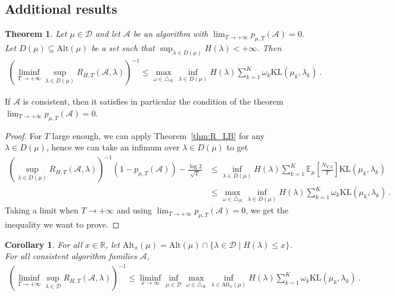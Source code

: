 \documentclass{article}
\newcommand{\KL}{\mathrm{KL}}
\newcommand{\alt}{\mathrm{Alt}}
\newtheorem{theorem}{Theorem}
\newtheorem{corollary}{Corollary}
\begin{document}
\subsection{Additional results}
\label{sub:additional_results}

\begin{theorem}\label{thm:asm_R_LB}
Let $\mu \in \mathcal D$ and let $\mathcal A$ be an algorithm with $\lim_{T \to + \infty} p_{\mu, T}(\mathcal A) = 0$. Let $D(\mu) \subseteq \alt(\mu)$ be a set such that $\sup_{\lambda \in D(\mu)} H(\lambda) < +\infty$. Then
\begin{align*}
(\liminf_{T\to +\infty}\sup_{\lambda \in D(\mu)}R_{H,T}(\mathcal A, \lambda))^{-1}
\le \max_{\omega \in \triangle_K} \inf_{\lambda \in D(\mu)} H(\lambda)\sum_{k=1}^K \omega_k \KL(\mu_k, \lambda_k)
\: .
\end{align*}
\end{theorem}
If $\mathcal A$ is consistent, then it satisfies in particular the condition of the theorem $\lim_{T \to + \infty} p_{\mu, T}(\mathcal A) = 0$.

\begin{proof}
For $T$ large enough, we can apply Theorem~\ref{thm:R_LB} for any $\lambda \in D(\mu)$, hence we can take an infimum over $\lambda \in D(\mu)$ to get
\begin{align*}
(\sup_{\lambda \in D(\mu)}R_{H,T}(\mathcal A, \lambda))^{-1} (1 - p_{\mu, T}(\mathcal A)) - \frac{\log 2}{\sqrt{T}}
&\le \inf_{\lambda \in D(\mu)} H(\lambda)\sum_{k=1}^K \mathbb{E}_\mu[\frac{N_{T,k}}{T}] \KL(\mu_k, \lambda_k)
\\
&\le \max_{\omega \in \triangle_K} \inf_{\lambda \in D(\mu)} H(\lambda)\sum_{k=1}^K \omega_k \KL(\mu_k, \lambda_k)
\: .
\end{align*}
Taking a limit when $T \to +\infty$ and using $\lim_{T \to + \infty} p_{\mu, T}(\mathcal A) = 0$, we get the inequality we want to prove.
\end{proof}

\begin{corollary}
For all $x \in \mathbb{R}$, let $\alt_x(\mu) = \alt(\mu) \cap \{\lambda \in \mathcal D \mid H(\lambda) \le x\}$. For all consistent algorithm families $\mathcal A$,
\begin{align*}
(\liminf_{T\to +\infty}\sup_{\lambda \in \mathcal D}R_{H,T}(\mathcal A, \lambda))^{-1}
\le \liminf_{x \to \infty} \inf_{\mu \in \mathcal D} \max_{\omega \in \triangle_K} \inf_{\lambda \in \alt_x(\mu)} H(\lambda)\sum_{k=1}^K \omega_k \KL(\mu_k, \lambda_k)
\: .
\end{align*}
\end{corollary}
\end{document}
